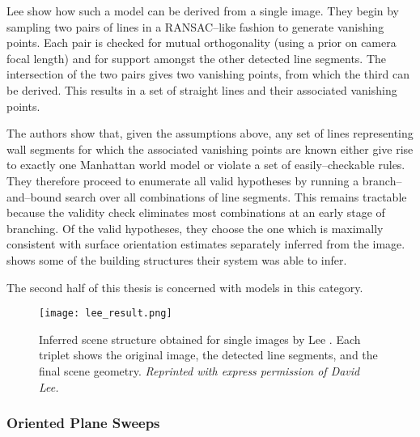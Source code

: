 Lee \etal show how such a model can be derived from a single
image. They begin by sampling two pairs of lines in a RANSAC--like
fashion to generate vanishing points. Each pair is checked for mutual
orthogonality (using a prior on camera focal length) and for support
amongst the other detected line segments. The intersection of the two
pairs gives two vanishing points, from which the third can be
derived. This results in a set of straight lines and their associated
vanishing points.

The authors show that, given the assumptions above, any set of lines
representing wall segments for which the associated vanishing points
are known either give rise to exactly one Manhattan world model or
violate a set of easily--checkable rules. They therefore proceed to
enumerate all valid hypotheses by running a branch--and--bound search
over all combinations of line segments. This remains tractable because
the validity check eliminates most combinations at an early stage of
branching. Of the valid hypotheses, they choose the one which is
maximally consistent with surface orientation estimates separately
inferred from the image.  shows some of the
building structures their system was able to infer.

The second half of this thesis is concerned with models in this
category.

\begin{figure}[tb]
  \centering
  \texttt{[image: lee\_result.png]}
  \caption{Inferred scene structure obtained for single images by Lee
    \etal \cite{Lee09}. Each triplet shows the original image, the
    detected line segments, and the final scene geometry.
    \textit{Reprinted with express permission of David Lee.}
  }
  \label{fig:lee-result}
\end{figure}

\subsubsection{Oriented Plane Sweeps}


